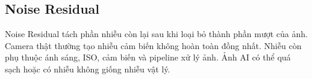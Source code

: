 \subsection{Noise Residual}
Noise Residual tách phần nhiễu còn lại sau khi loại bỏ thành phần mượt của ảnh. Camera thật thường tạo nhiễu cảm biến không hoàn toàn đồng nhất. Nhiễu còn phụ thuộc ánh sáng, ISO, cảm biến và pipeline xử lý ảnh. Ảnh AI có thể quá sạch hoặc có nhiễu không giống nhiễu vật lý.
